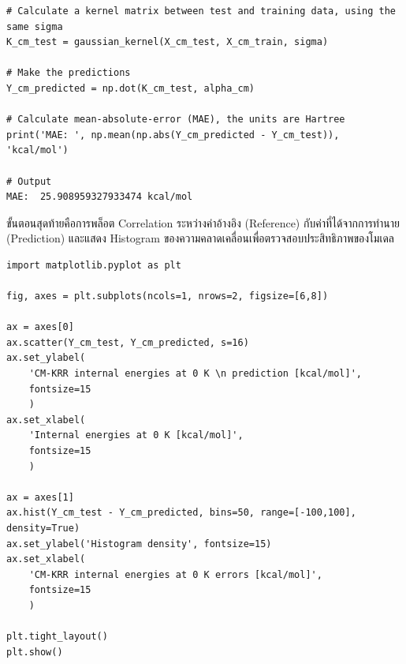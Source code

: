 \begin{lstlisting}[style=MyPython]
# Calculate a kernel matrix between test and training data, using the same sigma
K_cm_test = gaussian_kernel(X_cm_test, X_cm_train, sigma)

# Make the predictions
Y_cm_predicted = np.dot(K_cm_test, alpha_cm)

# Calculate mean-absolute-error (MAE), the units are Hartree
print('MAE: ', np.mean(np.abs(Y_cm_predicted - Y_cm_test)), 'kcal/mol')

# Output
MAE:  25.908959327933474 kcal/mol
\end{lstlisting}

\vspace{1em}
ขั้นตอนสุดท้ายคือการพล็อต Correlation ระหว่างค่าอ้างอิง (Reference) กับค่าที่ได้จากการทำนาย (Prediction) และแสดง Histogram 
ของความคลาดเคลื่อนเพื่อตรวจสอบประสิทธิภาพของโมเดล

\begin{lstlisting}[style=MyPython]
import matplotlib.pyplot as plt

fig, axes = plt.subplots(ncols=1, nrows=2, figsize=[6,8])

ax = axes[0]
ax.scatter(Y_cm_test, Y_cm_predicted, s=16)
ax.set_ylabel(
    'CM-KRR internal energies at 0 K \n prediction [kcal/mol]', 
    fontsize=15
    )
ax.set_xlabel(
    'Internal energies at 0 K [kcal/mol]', 
    fontsize=15
    )

ax = axes[1]
ax.hist(Y_cm_test - Y_cm_predicted, bins=50, range=[-100,100], density=True)
ax.set_ylabel('Histogram density', fontsize=15)
ax.set_xlabel(
    'CM-KRR internal energies at 0 K errors [kcal/mol]', 
    fontsize=15
    )

plt.tight_layout()
plt.show()
\end{lstlisting}

